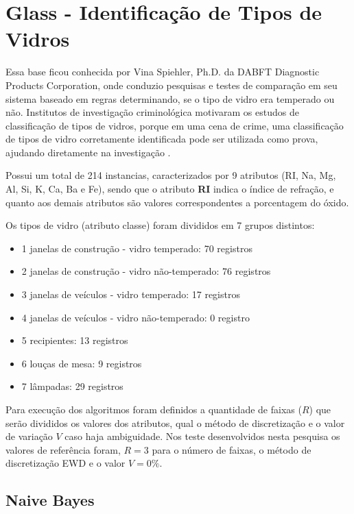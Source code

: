 \section{Glass - Identificação de Tipos de Vidros}\label{cap:resultados:ssec:iris}

Essa base ficou conhecida por Vina Spiehler, Ph.D. da DABFT Diagnostic Products Corporation, onde conduzio pesquisas e testes de comparação em seu sistema baseado em regras determinando, se o tipo de vidro era temperado ou não. Institutos de investigação criminológica motivaram os estudos de classificação de tipos de vidros, porque em uma cena de crime, uma classificação de tipos de vidro corretamente identificada pode ser utilizada como prova, ajudando diretamente na investigação \cite{Evett:1989}.

Possui um total de 214 instancias, caracterizados por 9 atributos (RI, Na, Mg, Al, Si, K, Ca, Ba e Fe), sendo que o atributo \textbf{RI} indica o índice de refração, e quanto aos demais atributos são valores correspondentes a porcentagem do óxido.

Os tipos de vidro (atributo classe) foram divididos em 7 grupos distintos:
\begin{itemize}
 \item 1 janelas de construção - vidro temperado: 70 registros
 \item 2 janelas de construção - vidro não-temperado: 76 registros
 \item 3 janelas de veículos - vidro temperado: 17 registros
 \item 4 janelas de veículos - vidro não-temperado: 0 registro
 \item 5 recipientes: 13 registros
 \item 6 louças de mesa: 9 registros
 \item 7 lâmpadas: 29 registros 
\end{itemize}

Para execução dos algoritmos foram definidos a quantidade de faixas (${R}$) que serão divididos os valores dos atributos, qual o método de discretização e o valor de variação ${V}$ caso haja ambiguidade. Nos teste desenvolvidos nesta pesquisa os valores de referência foram, ${R=3}$ para o número de faixas, o método de discretização EWD e o valor  ${V=0\%}$.


\subsection{Naive Bayes} \label{cap:resultados:ssec:glass:nb}

